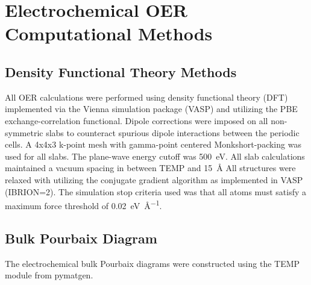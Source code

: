 




\section{Electrochemical OER Computational Methods}  %
%

\subsection{Density Functional Theory Methods}  %
%
%
All OER calculations were performed using density functional theory (DFT) implemented via the Vienna  simulation package (VASP)
\cite{Kresse1995,Kresse1996_0,Kresse1996_1}
and utilizing the PBE exchange-correlation functional\cite{Perdew1996}.
%
Dipole corrections were imposed on all non-symmetric slabs to counteract spurious dipole interactions between the periodic cells.\cite{Neugebauer1992}
%
A 4x4x3 k-point mesh with gamma-point centered Monkshort-packing\cite{Monkhorst1976} was used for all slabs.
%
The plane-wave energy cutoff was \SI{500}{\electronvolt}.
%
All slab calculations maintained a vacuum spacing in between TEMP and \SI{15}{\angstrom}
%
All structures were relaxed with utilizing the conjugate gradient algorithm as implemented in VASP (IBRION\num{=2}).
%
The simulation stop criteria used was that all atoms must satisfy a maximum force threshold of \SI{0.02}{\electronvolt\per\angstrom}.


\subsection{Bulk Pourbaix Diagram}  %
%
%
The electrochemical bulk Pourbaix diagrams were constructed using the TEMP module from pymatgen.


